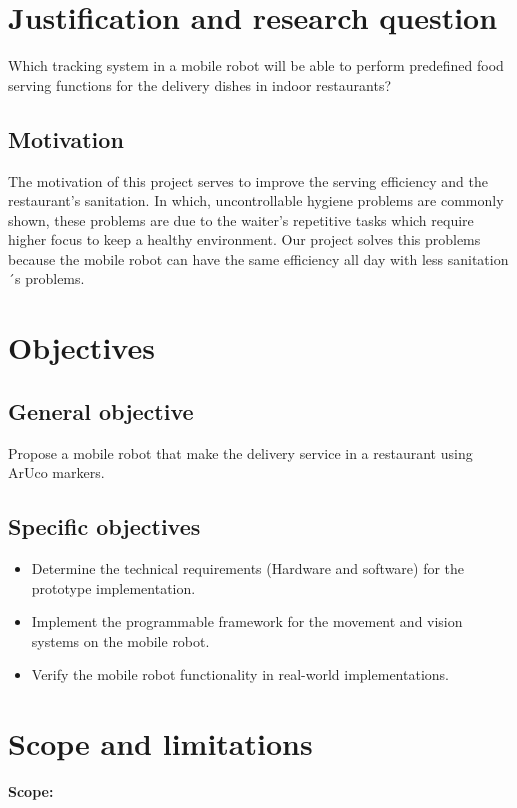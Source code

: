 \section{Justification and research question}

Which tracking system in a mobile robot will be able to perform predefined food serving functions for the delivery dishes in indoor restaurants?

\subsection{Motivation}

The motivation of this project serves to improve the serving efficiency and the restaurant's sanitation. In which, uncontrollable hygiene problems are commonly shown, these problems are due to the waiter's repetitive tasks which require higher focus to keep a healthy environment. Our project solves this problems because the mobile robot can have the same efficiency all day with less sanitation´s problems.   

\section{Objectives}

\subsection{General objective}

Propose a mobile robot that make the delivery service in a restaurant  using ArUco markers. 

\subsection{Specific objectives}
\begin{itemize}
	\item Determine the technical requirements (Hardware and software) for the prototype implementation.
	\item Implement the programmable framework for the movement and vision systems on the mobile robot. 
	\item Verify the mobile robot functionality in real-world implementations.
\end{itemize}


\section{Scope and limitations}
\textbf{Scope:}


